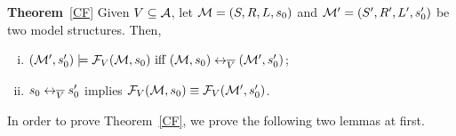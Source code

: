 \documentclass{article}
\begin{document}


\textbf{Theorem}~\ref{CF}
Given $V\subseteq {\cal A}$, let ${\cal M}=(S,R,L,s_0)$  and ${\cal M}'=(S',R', L',s_0')$ be two model structures. Then,
\begin{enumerate}[(i)]
\item  $({\cal M}',s_0') \models {\cal F}_V({\cal M},s_0)
\text{ iff } ({\cal M},s_0) \leftrightarrow_{\overline V} ({\cal M}',s_0')$;

\item  $s_0 \leftrightarrow_{\overline V} s_0'$ implies  ${\cal F}_V({\cal M}, s_0) \equiv {\cal F}_V({\cal M}', s_0')$.

\end{enumerate}

In order to prove Theorem~\ref{CF}, we prove the following two lemmas at first.
\end{document}
